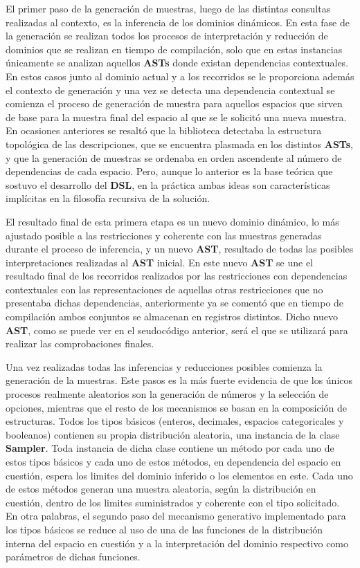 El primer paso de la generación de muestras, luego de las distintas consultas realizadas al contexto,
es la inferencia de los dominios dinámicos. En esta fase de la generación se realizan todos los procesos
de interpretación y reducción de dominios que se realizan en tiempo de compilación, solo que en estas
instancias únicamente se analizan aquellos {\bf ASTs} donde existan dependencias contextuales. En estos casos
junto al dominio actual y a los recorridos se le proporciona además el contexto de generación y una vez
se detecta una dependencia contextual se comienza el proceso de generación de muestra para aquellos espacios
que sirven de base para la muestra final del espacio al que se le solicitó una nueva muestra. En ocasiones
anteriores se resaltó que la biblioteca detectaba la estructura topológica de las descripciones, que se
encuentra plasmada en los distintos {\bf ASTs}, y que la generación de muestras se ordenaba en orden ascendente
al número de dependencias de cada espacio. Pero, aunque lo anterior es la base teórica que sostuvo el desarrollo
del {\bf DSL}, en la práctica ambas ideas son características implícitas en la filosofía recursiva de la solución.

El resultado final de esta primera etapa es un nuevo dominio dinámico, lo más ajustado posible a las restricciones
y coherente con las muestras generadas durante el proceso de inferencia, y un nuevo {\bf AST}, resultado de todas las
posibles interpretaciones realizadas al {\bf AST} inicial. En este nuevo {\bf AST} se une el resultado final de los recorridos
realizados por las restricciones con dependencias contextuales con las representaciones de aquellas otras restricciones
que no presentaba dichas dependencias, anteriormente ya se comentó que en tiempo de compilación ambos conjuntos
se almacenan en registros distintos. Dicho nuevo {\bf AST}, como se puede ver en el seudocódigo anterior, será el que se
utilizará para realizar las comprobaciones finales.

Una vez realizadas todas las inferencias y reducciones posibles comienza la generación de la muestras. Este pasos es
la más fuerte evidencia de que los únicos procesos realmente aleatorios son la generación de números y la selección de
opciones, mientras que el resto de los mecanismos se basan en la composición de estructuras. Todos los tipos básicos
(enteros, decimales, espacios categoricales y booleanos) contienen su propia distribución aleatoria, una instancia de
la clase {\bf Sampler}. Toda instancia de dicha clase contiene un método por cada uno de estos tipos básicos y cada uno de
estos métodos, en dependencia del espacio en cuestión, espera los limites del dominio inferido o los elementos en este.
Cada uno de estos métodos generan una muestra aleatoria, según la distribución en cuestión, dentro de los limites
suministrados y coherente con el tipo solicitado. En otra palabras, el segundo paso del mecanismo generativo implementado
para los tipos básicos se reduce al uso de una de las funciones de la distribución interna del espacio en cuestión y a la
interpretación del dominio respectivo como parámetros de dichas funciones.

